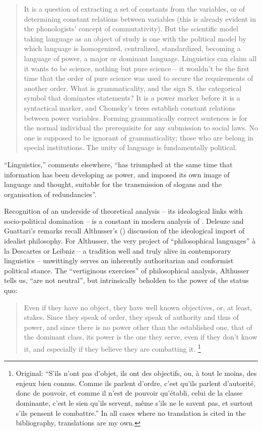 \documentclass[output=paper]{langscibook}
\begin{document}
\begin{quotation}
It is a question of extracting a set of constants from the variables, or of determining constant relations between variables (this is already evident in the phonologists' concept of commutativity). But the scientific model taking language as an object of study is one with the political model by which language is homogenized, centralized, standardized, becoming a language of power, a major or dominant language. Linguistics can claim all it wants to be science, nothing but pure science -- it wouldn't be the first time that the order of pure science was used to secure the requirements of another order. What is grammaticality, and the sign S, the categorical symbol that dominates statements? It is a power marker before it is a syntactical marker, and Chomsky’s trees establish constant relations between power variables. Forming grammatically correct sentences is for the normal individual the prerequisite for any submission to social laws. No one is supposed to be ignorant of grammaticality; those who are belong in special institutions. The unity of language is fundamentally political. \citep[100--101]{DeleuzeGuattari19871980}
\end{quotation}

``Linguistics,'' \citet[21]{Deleuze1977} comments elsewhere, ``has triumphed at the same time that information has been developing as power, and imposed its own image of language and thought, suitable for the transmission of slogans and the organisation of redundancies''.

Recognition of an underside of theoretical analysis -- its ideological links with socio-political domination -- is a constant in modern analysis of . Deleuze and Guattari's remarks recall Althusser's (\citeyear{Althusser2015}) discussion of the ideological import of idealist philosophy. For Althusser, the very project of ``philosophical languages'' à la Descartes or Leibniz -- a tradition well and truly alive in contemporary linguistics -- unwittingly serves an inherently authoritarian and conformist political stance. The ``vertiginous exercises'' of philosophical analysis, Althusser tells us, ``are not neutral'', but intrinsically beholden to the power of the status quo:

\begin{quotation}
Even if they have no object, they have well known objectives, or, at least, stakes. Since they speak of order, they speak of authority and thus of power, and since there is no power other than the established one, that of the dominant class, its power is the one they serve, even if they don’t know it, and especially if they believe they are combatting it. \citep[107]{Althusser2015}\footnote{Original: ``S'ils n'ont pas d'objet, ils ont des objectifs, ou, à tout le moins, des enjeux bien connus. Comme ils parlent d'ordre, c'est qu'ils parlent d'autorité, donc de pouvoir, et comme il n'est de pouvoir qu'établi, celui de la classe dominante, c'est le sien qu'ils servent, même s'ils ne le savent pas, et surtout s'ils pensent le combattre.'' In all cases where no translation is cited in the bibliography, translations are my own.}
\end{quotation}
\end{document}
